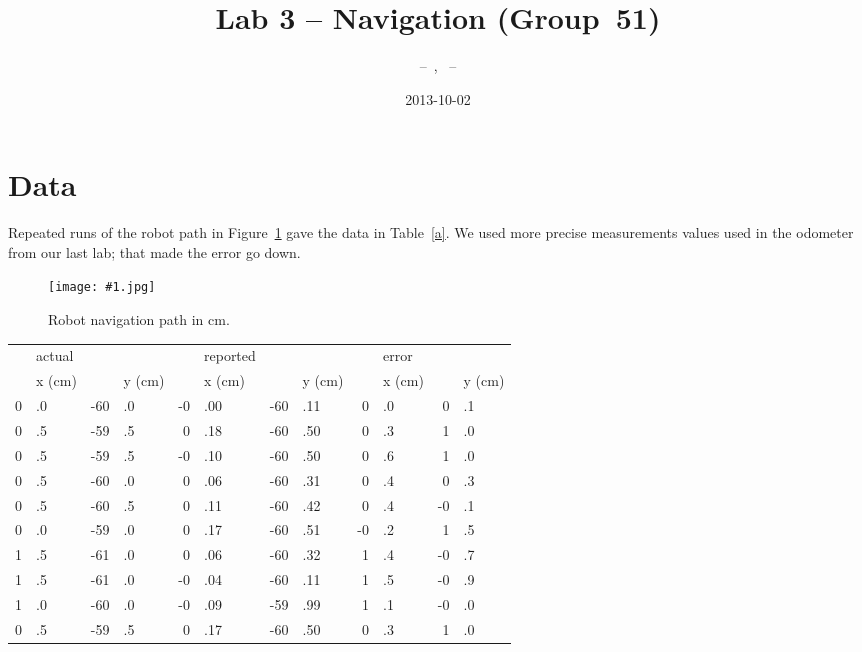 \documentclass[twocolumn]{article}
\author{\bname~--~\bid, \name~--~\id}
\title{Lab 3 -- Navigation (Group~51)}
\date{2013-10-02}
\def\fig#1#2{\begin{figure}[!ht]\begin{center}
\texttt{[image: \#1.jpg]}
\end{center}\caption{#2}\label{#1}\end{figure}}
\begin{document}
\maketitle



\section{Data}

Repeated runs of the robot path in Figure~\ref{path} gave the data in Table~\ref{a}. We used more precise measurements values used in the odometer from our last lab\cite{alexneil2}; that made the error go down.

\fig{path}{Robot navigation path in cm.\cite{lab3}}

\begin{table*}[htb]
\begin{center}\begin{tabular}{r@{}l r@{}l r@{}l r@{}l r@{}l r@{}l}
&actual&&& &reported&&& &error&& \\
&x (cm)& &y (cm)& &x (cm)& &y (cm)& &x (cm)& &y (cm) \\
\hline
0&.0& -60&.0& -0&.00& -60&.11& 0&.0& 0&.1 \\
0&.5& -59&.5& 0&.18& -60&.50& 0&.3& 1&.0 \\
0&.5& -59&.5& -0&.10& -60&.50& 0&.6& 1&.0 \\
0&.5& -60&.0& 0&.06& -60&.31& 0&.4& 0&.3 \\
0&.5& -60&.5& 0&.11& -60&.42& 0&.4& -0&.1 \\
0&.0& -59&.0& 0&.17& -60&.51& -0&.2& 1&.5 \\
1&.5& -61&.0& 0&.06& -60&.32& 1&.4& -0&.7 \\
1&.5& -61&.0& -0&.04& -60&.11& 1&.5& -0&.9 \\
1&.0& -60&.0& -0&.09& -59&.99& 1&.1& -0&.0 \\
0&.5& -59&.5& 0&.17& -60&.50& 0&.3& 1&.0 \\
\end{tabular}\end{center}
\caption{Reported error as read by the robot, and real error as read by a ruler and the difference between them.
The difference, as $(x, y)$, mean is $(0.60, 0.33)$, variance is $(0.33, 0.62)$, and the corrected sample standard deviation is $(0.58, 0.79)$.}
\label{a}
\end{table*}
\end{document}
